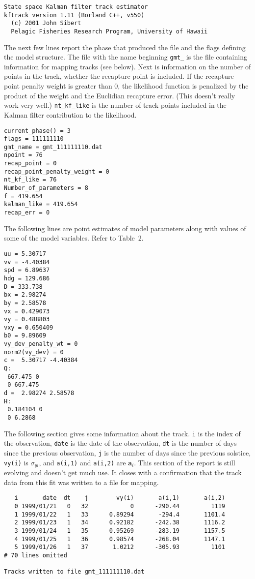 \documentclass[12pt,draft,titlepage,twoside]{article}
\begin{document}
\begin{verbatim}
State space Kalman filter track estimator
kftrack version 1.11 (Borland C++, v550)
  (c) 2001 John Sibert
  Pelagic Fisheries Research Program, University of Hawaii
\end{verbatim}

The next few lines report the phase that produced the file and the flags
defining the model structure. The file with the name beginning \texttt{gmt\_}
is the file containing information for mapping tracks (see below).
Next is information on the number of points in the track, whether the
recapture point is included. If the recapture point penalty weight is
greater than 0, the likelihood function is penalized by the product of the 
weight and the Euclidian recapture error. (This doesn't really work very well.)
\texttt{nt\_kf\_like} is the number of track points included in the Kalman filter
contribution to the likelihood.

\begin{verbatim}
current_phase() = 3
flags = 111111110
gmt_name = gmt_111111110.dat
npoint = 76
recap_point = 0
recap_point_penalty_weight = 0
nt_kf_like = 76
Number_of_parameters = 8
f = 419.654
kalman_like = 419.654
recap_err = 0
\end{verbatim}

The following lines are point estimates of model parameters along with
values of some of the model variables. Refer to Table~2.%

\begin{verbatim}
uu = 5.30717
vv = -4.40384
spd = 6.89637
hdg = 129.686
D = 333.738
bx = 2.98274
by = 2.58578
vx = 0.429073
vy = 0.488803
vxy = 0.650409
b0 = 9.89609
vy_dev_penalty_wt = 0
norm2(vy_dev) = 0
c =  5.30717 -4.40384
Q: 
 667.475 0
 0 667.475
d =  2.98274 2.58578
H: 
 0.184104 0
 0 6.2868
\end{verbatim}

The following section gives some information about the track. {\tt i} is the index of the observation, {\tt date} is the date of the observation, {\tt dt} is the
number of days since the previous observation, {\tt j} is the number of days since
the previous solstice, {\tt vy(i)} is $\sigma_{yi}$, and {\tt a(i,1)} and
{\tt a(i,2)} are $\mathbf{a}_i$. 
This section of the report is still evolving and doesn't get much use.
It closes with a confirmation that the track data from this fit was written 
to a file for mapping.

\begin{verbatim}
   i       date  dt    j        vy(i)       a(i,1)       a(i,2)
   0 1999/01/21   0   32            0      -290.44         1119
   1 1999/01/22   1   33      0.89294       -294.4       1101.4
   2 1999/01/23   1   34      0.92182      -242.38       1116.2
   3 1999/01/24   1   35      0.95269      -283.19       1157.5
   4 1999/01/25   1   36      0.98574      -268.04       1147.1
   5 1999/01/26   1   37       1.0212      -305.93         1101
# 70 lines omitted

Tracks written to file gmt_111111110.dat
\end{verbatim}
\end{document}
